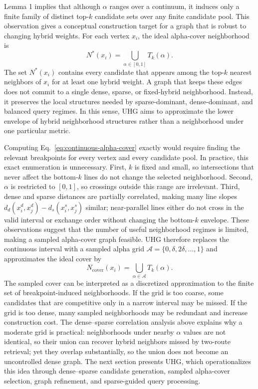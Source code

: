 Lemma 1 implies that although $\alpha$ ranges over a continuum, it induces only a finite family of distinct top-$k$ candidate sets over any finite candidate pool. This observation gives a conceptual construction target for a graph that is robust to changing hybrid weights. For each vertex $x_i$, the ideal alpha-cover neighborhood is
\begin{equation}
    N^*(x_i)=\bigcup_{\alpha\in[0,1]}T_k(\alpha).
    \label{eq:continuous-alpha-cover}
\end{equation}
The set $N^*(x_i)$ contains every candidate that appears among the top-$k$ nearest neighbors of $x_i$ for at least one hybrid weight. A graph that keeps these edges does not commit to a single dense, sparse, or fixed-hybrid neighborhood. Instead, it preserves the local structures needed by sparse-dominant, dense-dominant, and balanced query regimes. In this sense, UHG aims to approximate the lower envelope of hybrid neighborhood structures rather than a neighborhood under one particular metric.

Computing Eq.~\eqref{eq:continuous-alpha-cover} exactly would require finding the relevant breakpoints for every vertex and every candidate pool. In practice, this exact enumeration is unnecessary. First, $k$ is fixed and small, so intersections that never affect the bottom-$k$ lines do not change the selected neighborhood. Second, $\alpha$ is restricted to $[0,1]$, so crossings outside this range are irrelevant. Third, dense and sparse distances are partially correlated, making many line slopes $d_d(x_i^d,x_j^d)-d_s(x_i^s,x_j^s)$ similar; near-parallel lines either do not cross in the valid interval or exchange order without changing the bottom-$k$ envelope. These observations suggest that the number of useful neighborhood regimes is limited, making a sampled alpha-cover graph feasible. UHG therefore replaces the continuous interval with a sampled alpha grid $\mathcal{A}=\{0,\delta,2\delta,\ldots,1\}$ and approximates the ideal cover by
\begin{equation}
    N_{\mathrm{cover}}(x_i)=\bigcup_{\alpha\in\mathcal{A}}T_k(\alpha).
    \label{eq:sampled-alpha-cover-motivation}
\end{equation}
The sampled cover can be interpreted as a discretized approximation to the finite set of breakpoint-induced neighborhoods. If the grid is too coarse, some candidates that are competitive only in a narrow interval may be missed. If the grid is too dense, many sampled neighborhoods may be redundant and increase construction cost. The dense--sparse correlation analysis above explains why a moderate grid is practical: neighborhoods under nearby $\alpha$ values are not identical, so their union can recover hybrid neighbors missed by two-route retrieval; yet they overlap substantially, so the union does not become an uncontrolled dense graph. The next section presents UHG, which operationalizes this idea through dense--sparse candidate generation, sampled alpha-cover selection, graph refinement, and sparse-guided query processing.
